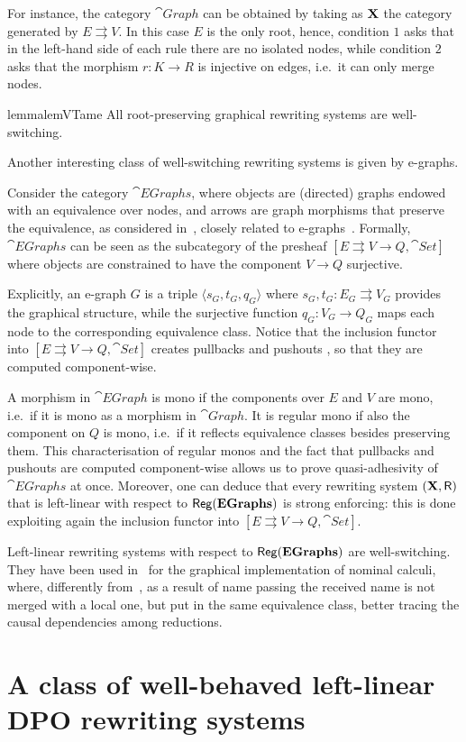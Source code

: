 For instance, the category $\cat{Graph}$ can be obtained
by taking as $\textbf {\textup{X}}$ the category generated by $E \rightrightarrows V$. In this case $E$ is the only root, hence, condition $1$ asks that in the left-hand side of each rule
there are no isolated nodes, while condition $2$ asks that the
morphism $r: K \to R$ is injective on edges, i.e.~it can only merge nodes.

\begin{lemma}{lemma}{lemVTame}
	\label{bono}
	All root-preserving graphical rewriting systems are well-switching.
\end{lemma}

Another interesting class of well-switching rewriting systems is given by e-graphs.

\begin{example}[E-graphs]
	Consider the category $\cat{EGraphs}$, where objects are (directed)
	graphs endowed with an equivalence over nodes, and arrows are graph
	morphisms that preserve the equivalence, as considered
	in~\cite{BaldanGM06}, closely related to e-graphs~\cite{WNW:egg}. 
	Formally, $\cat{EGraphs}$ can be seen as the
	subcategory of the presheaf
	$[E \rightrightarrows V \to Q, \cat{Set}]$ where objects are
	constrained to have the component $V \to Q$ surjective. 
	
	Explicitly, an
	e-graph $G$ is a triple $\langle s_G, t_G, q_G \rangle$ where
	$s_G, t_G: E_G \rightrightarrows V_G$ provides the graphical
	structure, while the surjective function $q_G : V_G \to Q_G$ maps
	each node to the corresponding equivalence class. 
	Notice that the inclusion functor into  $[E \rightrightarrows V \to Q, \cat{Set}]$ 
	creates pullbacks and pushouts \cite{mac2013categories}, so that they are computed component-wise.
	
	A morphism in $\cat{EGraph}$ is mono if the components over $E$
	and $V$ are mono, i.e.~if it is mono as a morphism in
	$\cat{Graph}$. It is regular mono if also the component on
	$Q$ is mono, i.e.~if it reflects equivalence classes besides
	preserving them. This characterisation of regular monos and the fact that pullbacks and pushouts are computed component-wise allows us to prove quasi-adhesivity of $\cat{EGraphs}$ at once. Moreover, one can deduce that every rewriting system $(\textbf {\textup{X}}, \mathsf{R})$ that is left-linear with respect to $\mathsf{Reg}(\mathbf{EGraphs})$ is strong enforcing: this is done exploiting again the inclusion functor into $[E \rightrightarrows V \to Q, \cat{Set}]$.
	
	Left-linear rewriting systems with respect to $\mathsf{Reg}(\mathbf{EGraphs})$ are well-switching. They have been used in~\cite{BaldanGM06} for the graphical implementation of nominal calculi, where,
	differently from~\cite{Gad07}, as a result of name passing the received name is not merged with a local one, but put in the same equivalence class, better tracing the causal dependencies among reductions.
\end{example}



\section{A class of well-behaved left-linear DPO rewriting systems}
